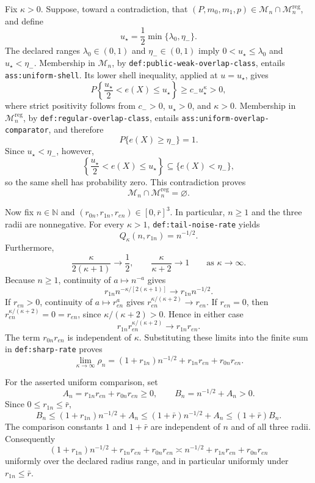 Fix \(\kappa>0\).  Suppose, toward a contradiction, that
\((P,m_0,m_1,p)\in\mathcal M_n\cap\mathcal M_n^{\mathrm{reg}}\), and define
\[
u_\star=\frac12\min\{\lambda_0,\eta_-\}.
\]
The declared ranges \(\lambda_0\in(0,1)\) and \(\eta_-\in(0,1)\) imply
\(0<u_\star\le\lambda_0\) and \(u_\star<\eta_-\).  Membership in
\(\mathcal M_n\), by \texttt{def:public-weak-overlap-class}, entails
\texttt{ass:uniform-shell}.  Its lower shell inequality, applied at
\(u=u_\star\), gives
\[
P\!\left\{\frac{u_\star}{2}<e(X)\le u_\star\right\}
\ge c_-u_\star^\kappa>0,
\]
where strict positivity follows from \(c_->0\), \(u_\star>0\), and
\(\kappa>0\).  Membership in \(\mathcal M_n^{\mathrm{reg}}\), by
\texttt{def:regular-overlap-class}, entails
\texttt{ass:uniform-overlap-comparator}, and therefore
\[
P\{e(X)\ge\eta_-\}=1.
\]
Since \(u_\star<\eta_-\), however,
\[
\left\{\frac{u_\star}{2}<e(X)\le u_\star\right\}
\subseteq\{e(X)<\eta_-\},
\]
so the same shell has probability zero.  This contradiction proves
\[
\mathcal M_n\cap\mathcal M_n^{\mathrm{reg}}=\varnothing.
\]

Now fix \(n\in\mathbb N\) and
\((r_{0n},r_{1n},r_{en})\in[0,\bar r]^3\).  In particular, \(n\ge1\) and
the three radii are nonnegative.  For every \(\kappa>1\),
\texttt{def:tail-noise-rate} yields
\[
Q_\kappa(n,r_{1n})=n^{-1/2}.
\]
Furthermore,
\[
\frac{\kappa}{2(\kappa+1)}\longrightarrow\frac12,
\qquad
\frac{\kappa}{\kappa+2}\longrightarrow1
\qquad\text{as }\kappa\to\infty.
\]
Because \(n\ge1\), continuity of \(a\mapsto n^{-a}\) gives
\[
r_{1n}n^{-\kappa/[2(\kappa+1)]}
\longrightarrow r_{1n}n^{-1/2}.
\]
If \(r_{en}>0\), continuity of \(a\mapsto r_{en}^{a}\) gives
\(r_{en}^{\kappa/(\kappa+2)}\to r_{en}\).  If \(r_{en}=0\), then
\(r_{en}^{\kappa/(\kappa+2)}=0=r_{en}\), since
\(\kappa/(\kappa+2)>0\).  Hence in either case
\[
r_{1n}r_{en}^{\kappa/(\kappa+2)}
\longrightarrow r_{1n}r_{en}.
\]
The term \(r_{0n}r_{en}\) is independent of \(\kappa\).  Substituting these
limits into the finite sum in \texttt{def:sharp-rate} proves
\[
\lim_{\kappa\to\infty}\rho_n
=(1+r_{1n})n^{-1/2}+r_{1n}r_{en}+r_{0n}r_{en}.
\]

For the asserted uniform comparison, set
\[
A_n=r_{1n}r_{en}+r_{0n}r_{en}\ge0,
\qquad
B_n=n^{-1/2}+A_n>0.
\]
Since \(0\le r_{1n}\le\bar r\),
\[
B_n
\le (1+r_{1n})n^{-1/2}+A_n
\le (1+\bar r)n^{-1/2}+A_n
\le (1+\bar r)B_n.
\]
The comparison constants \(1\) and \(1+\bar r\) are independent of \(n\)
and of all three radii.  Consequently
\[
(1+r_{1n})n^{-1/2}+r_{1n}r_{en}+r_{0n}r_{en}
\asymp n^{-1/2}+r_{1n}r_{en}+r_{0n}r_{en}
\]
uniformly over the declared radius range, and in particular uniformly under
\(r_{1n}\le\bar r\).

